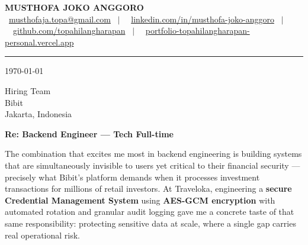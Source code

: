 \documentclass[11pt,a4paper]{article}
\newcommand{\contactline}[1]{\small #1}
\begin{document}
\begin{center}
    {\LARGE \textbf{MUSTHOFA JOKO ANGGORO}} \\[4pt]
    \contactline{
        \faEnvelope\ \href{mailto:musthofaja.topa@gmail.com}{musthofaja.topa@gmail.com} \ $|$ \ 
        \faLinkedin\ \href{https://www.linkedin.com/in/musthofa-joko-anggoro/}{linkedin.com/in/musthofa-joko-anggoro} \ $|$ \
        \faGithub\ \href{https://github.com/topahilangharapan}{github.com/topahilangharapan} \ $|$ \
        \faGlobe\ \href{https://portfolio-topahilangharapan-personal.vercel.app/}{portfolio-topahilangharapan-personal.vercel.app}
    }
\end{center}

\vspace{4pt}
\noindent\rule{\textwidth}{0.4pt}
\vspace{4pt}

\today

\vspace{4pt}

Hiring Team \\
Bibit \\
Jakarta, Indonesia

\vspace{4pt}

\textbf{Re: Backend Engineer — Tech Full-time}

\vspace{4pt}


The combination that excites me most in backend engineering is building systems that are simultaneously invisible to users yet critical to their financial security — precisely what Bibit's platform demands when it processes investment transactions for millions of retail investors. At Traveloka, engineering a \textbf{secure Credential Management System} using \textbf{AES-GCM encryption} with automated rotation and granular audit logging gave me a concrete taste of that same responsibility: protecting sensitive data at scale, where a single gap carries real operational risk.
\end{document}
